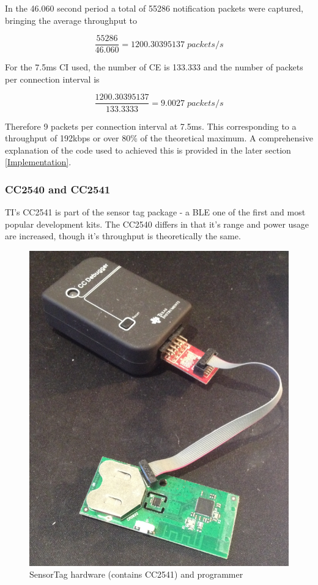 \documentclass[]{article}
\begin{document}
In the 46.060 second period a total of 55286 notification packets were captured, bringing the average throughput to


\begin{displaymath}
\frac{55286}{46.060} = 1200.30395137\; packets/s
\end{displaymath}

For the 7.5ms \ac{CI} used, the number of \ac{CE} is 133.333 and the number of packets per connection interval is

\begin{displaymath}
\frac{1200.30395137}{133.3333} = 9.0027\; packets/s
\end{displaymath}

Therefore 9 packets per connection interval at 7.5ms. This corresponding to a throughput of 192kbps or over 80\% of the theoretical maximum. A comprehensive explanation of the code used to achieved this is provided in the later section \ref{Implementation}. 

\clearpage
\subsubsection{CC2540 and CC2541}
\ac{TI}'s CC2541 is part of the sensor tag package - a \ac{BLE} one of the first and most popular development kits. The CC2540 differs in that it's range and power usage are increased, though it's throughput is theoretically the same.

\begin{figure}[H]
	\begin{center}
		\includegraphics[width = \textwidth]{sensortag}
	\end{center}
	\caption{SensorTag hardware (contains CC2541) and programmer}
	\label{fig:sensortag}
\end{figure}
\end{document}
